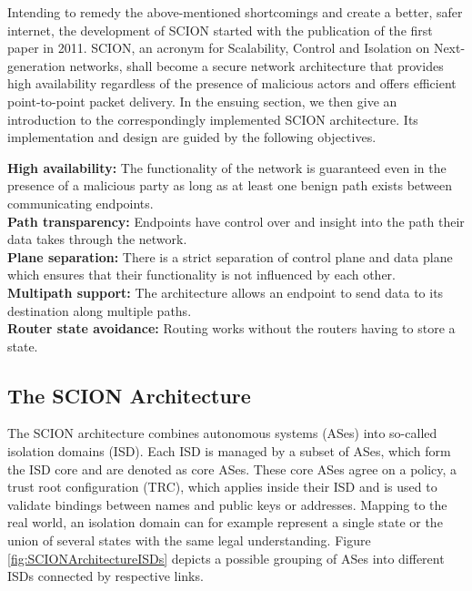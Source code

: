 Intending to remedy the above-mentioned shortcomings and create a better, safer internet, the development of SCION started with the publication of the first paper \cite{SCIONPaper} in 2011. SCION, an acronym for Scalability, Control and Isolation on Next-generation networks, shall become a secure network architecture that provides high availability regardless of the presence of malicious actors and offers efficient point-to-point packet delivery. In the ensuing section, we then give an introduction to the correspondingly implemented SCION architecture. Its implementation and design are guided by the following objectives.

{\small \textbf{High availability:} The functionality of the network is guaranteed even in the presence of a malicious party as long as at least one benign path exists between communicating endpoints. \smallskip\\
	\textbf{Path transparency:} Endpoints have control over and insight into the path their data takes through the network. \smallskip\\
	\textbf{Plane separation:} There is a strict separation of control plane and data plane which ensures that their functionality is not influenced by each other. \smallskip\\
	\textbf{Multipath support:} The architecture allows an endpoint to send data to its destination along multiple paths. \smallskip\\
	\textbf{Router state avoidance:} Routing works without the routers having to store a state.
}

\subsection*{The SCION Architecture}

The SCION architecture combines autonomous systems (ASes) into so-called isolation domains (ISD). Each ISD is managed by a subset of ASes, which form the ISD core and are denoted as core ASes. These core ASes agree on a policy, a trust root configuration (TRC), which applies inside their ISD and is used to validate bindings between names and public keys or addresses. Mapping to the real world, an isolation domain can for example represent a single state or the union of several states with the same legal understanding. Figure \ref{fig:SCIONArchitectureISDs} depicts a possible grouping of ASes into different ISDs connected by respective links.

